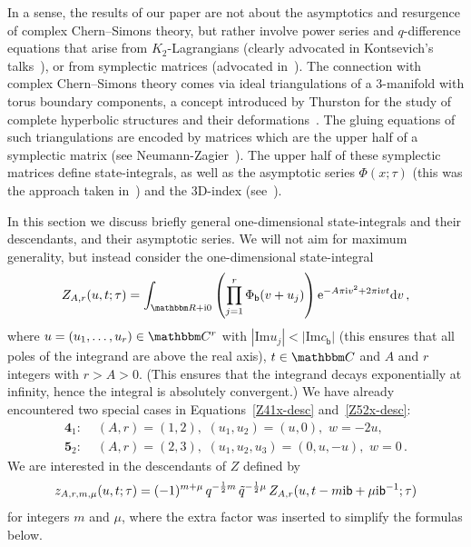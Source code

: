 \documentclass[12pt,reqno]{amsart}
\theoremstyle{definition}
\def\BR{\mathbbm R}
\def\BC{\mathbbm C}
\def\tq{\tilde{q}}
\def\bb{\mathsf{b}}
\def\ri{\mathrm{i}}
\def\rd{\mathrm{d}}
\def\re{{\rm e}}
\def\ri{{\rm i}}
\def\rd{{\rm d}}
\def\Im{\mathrm{Im}}
\def\md{\mathbf}
\newcommand{\knot}[1]{\md{#1}}
\begin{document}
In a sense, the results of our paper are not about the asymptotics and
resurgence of complex Chern--Simons theory, but rather involve power
series and $q$-difference equations that arise from $K_2$-Lagrangians
(clearly advocated in Kontsevich's talks~\cite{kontsevich-talk}), or
from symplectic matrices (advocated in~\cite[Sec.7]{GZ:kashaev}). The
connection with complex Chern--Simons theory comes via ideal
triangulations of a 3-manifold with torus boundary components, a
concept introduced by Thurston for the study of complete hyperbolic
structures and their deformations~\cite{Thurston}.  The gluing
equations of such triangulations are encoded by matrices which are the
upper half of a symplectic matrix (see Neumann-Zagier~\cite{NZ}). The
upper half of these symplectic matrices define state-integrals, as well 
as the asymptotic series $\Phi(x;\tau)$ (this was the approach
taken in~\cite{DG}) and the 3D-index (see~\cite{DGG1}).

In this section we discuss briefly general one-dimensional
state-integrals and their descendants, and their asymptotic series. We
will not aim for maximum generality, but instead consider the
one-dimensional state-integral
\begin{equation}
  \label{I1d}
  Z_{A,r}(u,t;\tau)
  =\int_{\BR+\ri 0}
  \left(\prod_{j=1}^r\Phi_\bb(v+u_j)\right)
  \re^{-A\pi\ri v^2 + 2\pi\ri v t} \rd v \,,%
\end{equation}
where $u=(u_1,\dots,u_r) \in \BC^r$ with $|\Im u_j| < |\Im c_\bb|$
(this ensures that all poles of the integrand are above the real
axis), $t \in \BC$ and $A$ and $r$ integers with $r>A>0$. (This
ensures that the integrand decays exponentially at infinity, hence the
integral is absolutely convergent.) We have already encountered two
special cases in Equations~\eqref{Z41x-desc} and~\eqref{Z52x-desc}:
\begin{align}
  \label{I4152a}
  \knot{4}_1:
  & \,\, (A,r)=(1,2), \,\, (u_1,u_2) = (u,0), \,\, w = -2u, \\
  \label{I4152b} \knot{5}_2:
  & \,\, (A,r)=(2,3), \,\, (u_1,u_2,u_3) = (0,u,-u),
    \,\, w = 0 \,.
\end{align}
We are interested in the descendants of $Z$ defined by
\begin{equation}
  \label{I1dd}
  z_{A,r,m,\mu}(u,t;\tau) = (-1)^{m+\mu} \,
  q^{-\frac{1}{2}m} \, \tq^{-\frac{1}{2}\mu} \,
  Z_{A,r}(u,t - m \ri \bb + \mu \ri \bb^{-1};\tau)
\end{equation}
for integers $m$ and $\mu$, where the extra factor was inserted to
simplify the formulas below.
\end{document}
